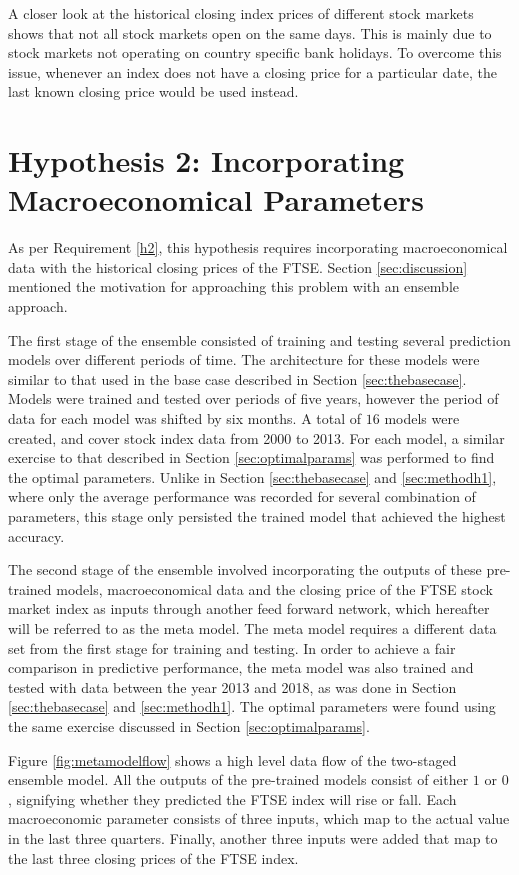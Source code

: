\documentclass{UoYCSproject}
\begin{document}
A closer look at the historical closing index prices of different stock markets shows that not all stock markets open on the same days. This is mainly due to stock markets not operating on country specific bank holidays. To overcome this issue, whenever an index does not have a closing price for a particular date, the last known closing price would be used instead.  

\section{Hypothesis 2: Incorporating Macroeconomical Parameters}
\label{sec:methodh2}
As per Requirement \ref{h2}, this hypothesis requires incorporating macroeconomical data with the historical closing prices of the FTSE. Section \ref{sec:discussion} mentioned the motivation for approaching this problem with an ensemble approach. 

The first stage of the ensemble consisted of training and testing several prediction models over different periods of time. The architecture for these models were similar to that used in the base case described in Section \ref{sec:thebasecase}. Models were trained and tested over periods of five years, however the period of data for each model was shifted by six months. A total of $16$ models were created, and cover stock index data from 2000 to 2013. For each model, a similar exercise to that described in Section \ref{sec:optimalparams} was performed to find the optimal parameters. Unlike in Section \ref{sec:thebasecase} and \ref{sec:methodh1}, where only the average performance was recorded for several combination of parameters, this stage only persisted the trained model that achieved the highest accuracy.  

The second stage of the ensemble involved incorporating the outputs of these pre-trained models, macroeconomical data and the closing price of the FTSE stock market index as inputs through another feed forward network, which hereafter will be referred to as the meta model. The meta model requires a different data set from the first stage for training and testing. In order to achieve a fair comparison in predictive performance, the meta model was also trained and tested with data between the year 2013 and 2018, as was done in Section \ref{sec:thebasecase} and \ref{sec:methodh1}. The optimal parameters were found using the same exercise discussed in Section \ref{sec:optimalparams}.  

Figure \ref{fig:metamodelflow} shows a high level data flow of the two-staged ensemble model. All the outputs of the pre-trained models consist of either $1$ or $0$, signifying whether they predicted the FTSE index will rise or fall. Each macroeconomic parameter consists of three inputs, which map to the actual value in the last three quarters. Finally, another three inputs were added that map to the last three closing prices of the FTSE index. 
\end{document}

